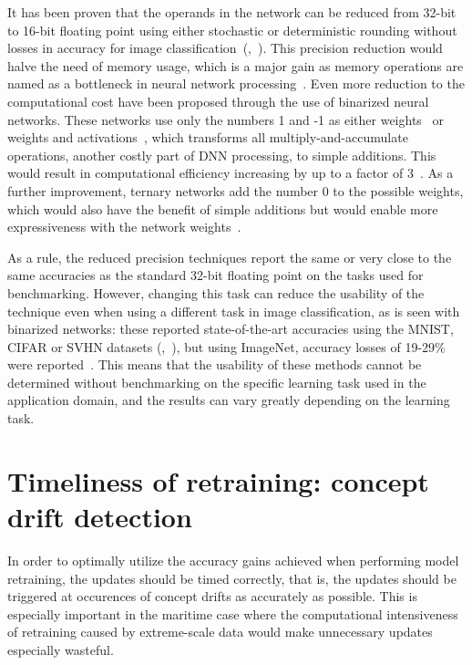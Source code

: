 It has been proven that the operands in the network can be reduced from 32-bit to 16-bit floating point using either stochastic or deterministic rounding without losses in accuracy for image classification~(\cite{pmlr-v37-gupta15},~\cite{micikeviciusMixedPrecisionTraining2018}). This precision reduction would halve the need of memory usage, which is a major gain as memory operations are named as a bottleneck in neural network processing~\cite{szeEfficientProcessingDeep2017}. Even more reduction to the computational cost have been proposed through the use of binarized neural networks. These networks use only the numbers 1 and -1 as either weights~\cite{courbariauxBinaryConnectTrainingDeep2016} or weights and activations~\cite{courbariauxBinarizedNeuralNetworks2016},  which transforms all multiply-and-accumulate operations, another costly part of DNN processing, to simple additions. This would result in computational efficiency increasing by up to a factor of 3~\cite{courbariauxBinaryConnectTrainingDeep2016}. As a further improvement, ternary networks add the number 0 to the possible weights, which would also have the benefit of simple additions but would enable more expressiveness with the network weights~\cite{liTernaryWeightNetworks2016}.

As a rule, the reduced precision techniques report the same or very close to the same accuracies as the standard 32-bit floating point on the tasks used for benchmarking. However, changing this task can reduce the usability of the technique even when using a different task in image classification, as is seen with binarized networks: these reported state-of-the-art accuracies using the MNIST, CIFAR or SVHN datasets (\cite{courbariauxBinarizedNeuralNetworks2016},~\cite{courbariauxBinaryConnectTrainingDeep2016}), but using ImageNet, accuracy losses of 19-29\% were reported~\cite{rastegariXNORNetImageNetClassification2016}. This means that the usability of these methods cannot be determined without benchmarking on the specific learning task used in the application domain, and the results can vary greatly depending on the learning task.

\section{Timeliness of retraining: concept drift detection}

In order to optimally utilize the accuracy gains achieved when performing model retraining, the updates should be timed correctly, that is, the updates should be triggered at occurences of concept drifts as accurately as possible. This is especially important in the maritime case where the computational intensiveness of retraining caused by extreme-scale data would make unnecessary updates especially wasteful.

